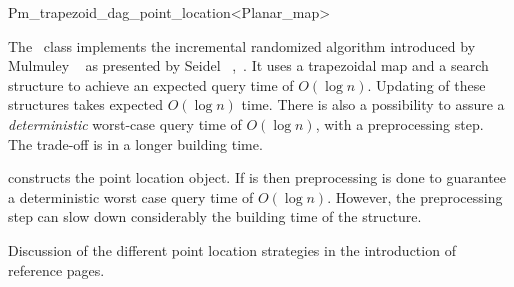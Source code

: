 
\ccRefPageBegin



\renewcommand{\ccRefPageBegin}{\begin{ccAdvanced}}
\renewcommand{\ccRefPageEnd}{\end{ccAdvanced}}

\begin{ccRefClass}{Pm_trapezoid_dag_point_location<Planar_map>}
\label{PL_sec:default}

\ccDefinition
The \ccRefName\ class
implements the incremental randomized algorithm introduced by
Mulmuley ~\cite{m-fppa-90} as presented by Seidel ~\cite{s-sfira-91},~\cite{bkos-cgaa-97}.
It uses a trapezoidal map and a search structure to 
achieve an expected query time of $O(\log n)$.
Updating of these structures takes expected $O(\log n)$ time. 
There is also a possibility to assure a {\em deterministic} worst-case query 
time  of $O(\log n)$, with a preprocessing step. The trade-off is in a longer
building time.

\ccThreeToTwo



\ccIsModel

\ccInheritsFrom

\ccCreation

{ constructs the point location object. If  is  then
preprocessing is done to guarantee a deterministic worst case query time of
$O(\log n)$. However, the preprocessing step can slow down considerably
the building time of the structure.}

\ccSeeAlso
   Discussion of the different point location strategies in the introduction
of  reference pages.

\end{ccRefClass}
\renewcommand{\ccRefPageBegin}{}
\renewcommand{\ccRefPageEnd}{}

\ccRefPageEnd
